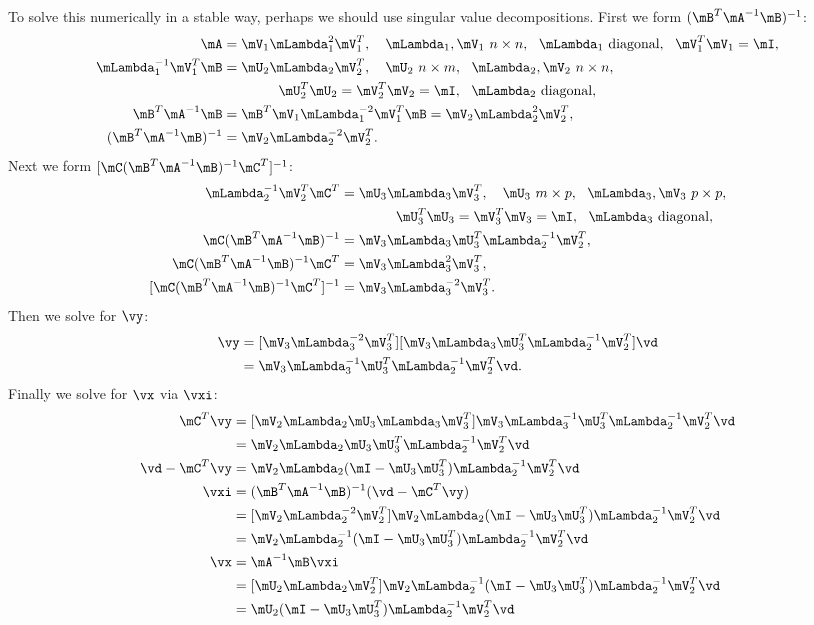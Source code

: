 \documentclass[]{amsart}
\theoremstyle{definition}
\theoremstyle{remark}
\begin{document}
To solve this numerically in a stable way, perhaps we should use singular value decompositions.  First we form $(\mB^T \mA^{-1} \mB)^{-1}$:
\begin{align*}
\mA &= \mV_1 \mLambda_1^2 \mV_1^T, \quad  \mLambda_1, \mV_1 \ n \times n, \ \ \mLambda_1 \text{ diagonal}, \ \ \mV^T_1 \mV_1 = \mI, \\
\mLambda_1^{-1} \mV_1^T \mB &= \mU_2 \mLambda_2 \mV_2^T, \quad \mU_2 \ n \times m, \ \ \mLambda_2, \mV_2 \ n \times n, \\
& \qquad \qquad \mU^T_2 \mU_2=\mV^T_2 \mV_2 = \mI, \ \ \mLambda_2 \text{ diagonal}, \\
\mB^T \mA^{-1} \mB & = \mB^T \mV_1 \mLambda_1^{-2} \mV_1^T \mB = \mV_2 \mLambda_2^2 \mV_2^T,\\
(\mB^T \mA^{-1} \mB)^{-1} & = \mV_2 \mLambda_2^{-2} \mV_2^T.
\end{align*}
Next we form $[\mC(\mB^T \mA^{-1} \mB)^{-1} \mC^T]^{-1}$:
\begin{align*}
\mLambda_2^{-1} \mV_2^T \mC^T &= \mU_3 \mLambda_3 \mV_3^T, \quad \mU_3 \ m \times p, \ \ \mLambda_3, \mV_3 \ p \times p, \\
& \qquad \qquad \mU^T_3 \mU_3=\mV^T_3 \mV_3 = \mI, \ \ \mLambda_3 \text{ diagonal}, \\
\mC(\mB^T \mA^{-1} \mB)^{-1} &= \mV_3 \mLambda_3  \mU_3^T \mLambda_2^{-1} \mV_2^{T}, \\
\mC(\mB^T \mA^{-1} \mB)^{-1} \mC^T & = \mV_3 \mLambda_3^2 \mV_3^T, \\
[\mC(\mB^T \mA^{-1} \mB)^{-1} \mC^T]^{-1} & = \mV_3 \mLambda_3^{-2} \mV_3^T.
\end{align*}
Then we solve for $\vy$:
\begin{align*}
\vy & = [\mV_3 \mLambda_3^{-2} \mV_3^T][\mV_3 \mLambda_3  \mU_3^T \mLambda_2^{-1} \mV_2^{T}]\vd \\
& = \mV_3 \mLambda_3^{-1} \mU_3^T \mLambda_2^{-1} \mV_2^{T} \vd.
\end{align*}
Finally we solve for $\vx$ via $\vxi$:
\begin{align*}
\mC^T\vy & = [\mV_2 \mLambda_2\mU_3 \mLambda_3 \mV_3^T] \mV_3 \mLambda_3^{-1} \mU_3^T \mLambda_2^{-1} \mV_2^{T} \vd \\
& = \mV_2 \mLambda_2 \mU_3 \mU_3^T \mLambda_2^{-1} \mV_2^{T} \vd \\
\vd-\mC^T\vy & = \mV_2 \mLambda_2 (\mI - \mU_3 \mU_3^T) \mLambda_2^{-1} \mV_2^{T} \vd \\
\vxi & = (\mB^T \mA^{-1} \mB)^{-1} (\vd - \mC^T \vy) \\
& = [\mV_2 \mLambda_2^{-2} \mV_2^T] \mV_2 \mLambda_2 (\mI - \mU_3 \mU_3^T) \mLambda_2^{-1} \mV_2^{T} \vd \\
& = \mV_2 \mLambda_2^{-1} (\mI - \mU_3 \mU_3^T) \mLambda_2^{-1} \mV_2^{T} \vd \\
\vx & = \mA^{-1} \mB \vxi \\
&=[\mU_2 \mLambda_2 \mV_2^T]\mV_2 \mLambda_2^{-1} (\mI - \mU_3 \mU_3^T) \mLambda_2^{-1} \mV_2^{T} \vd \\
&=\mU_2 (\mI - \mU_3 \mU_3^T) \mLambda_2^{-1} \mV_2^{T} \vd \\
\end{align*}


\end{document}
